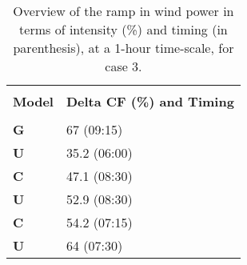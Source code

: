 
\begin{table}[htpb]
    \caption{Overview of the ramp in wind power in terms of intensity (\%) and timing (in parenthesis), at a 1-hour time-scale, for case 3.}
    \centering
    \begin{tabular}{l|p{3cm}}
        \hline \\
        \textbf{Model} & \textbf{Delta CF (\%) and Timing} \\
        \hline \\
            \textbf{G} & 67 (09:15) \\
        \textbf{U} & 35.2 (06:00) \\
        \textbf{C} & 47.1 (08:30) \\
        \textbf{U} & 52.9 (08:30) \\
        \textbf{C} & 54.2 (07:15) \\
        \textbf{U} & 64 (07:30) \\

        \hline
    \end{tabular}
    \label{ramp_in_capacity_factor_combined_case_3}
\end{table}

